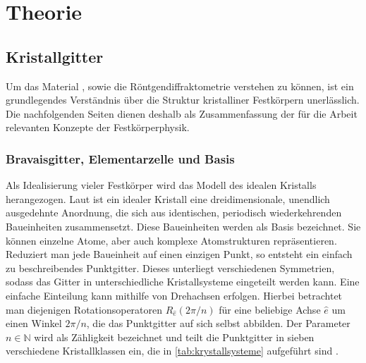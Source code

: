 \section{Theorie}\label{sec:theorie}

\subsection{Kristallgitter}\label{subsec:kristallgitter}
Um das Material \heo, sowie die Röntgendiffraktometrie verstehen zu können, ist ein grundlegendes Verständnis
über die Struktur kristalliner Festkörpern unerlässlich.
Die nachfolgenden Seiten dienen deshalb als Zusammenfassung der für die Arbeit relevanten Konzepte der Festkörperphysik.

\subsubsection{Bravaisgitter, Elementarzelle und Basis}
Als Idealisierung vieler Festkörper wird das Modell des idealen Kristalls herangezogen.
Laut  ist ein idealer Kristall eine dreidimensionale, unendlich ausgedehnte Anordnung,
die sich aus identischen, periodisch wiederkehrenden Baueinheiten zusammensetzt.
Diese Baueinheiten werden als Basis bezeichnet.
Sie können einzelne Atome, aber auch komplexe Atomstrukturen repräsentieren.
Reduziert man jede Baueinheit auf einen einzigen Punkt, so entsteht ein einfach zu beschreibendes Punktgitter.
Dieses unterliegt verschiedenen Symmetrien, sodass das Gitter in unterschiedliche Kristallsysteme eingeteilt werden
kann.
Eine einfache Einteilung kann mithilfe von Drehachsen erfolgen.
Hierbei betrachtet man diejenigen Rotationsoperatoren $R_{\hat{e}}(2\pi / n)$ für eine beliebige Achse $\hat{e}$ um
einen Winkel $2 \pi /n$, die das Punktgitter auf sich selbst abbilden.
Der Parameter $n \in \mathbb{N}$ wird als Zähligkeit bezeichnet und teilt die Punktgitter in sieben verschiedene
Kristallklassen ein, die in \cref{tab:krystallsysteme} aufgeführt sind \autocite{Hunklinger}.

